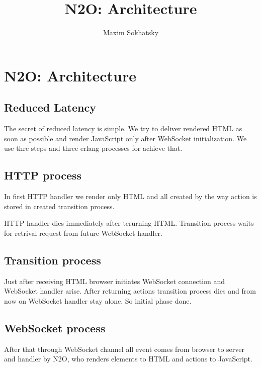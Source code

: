 \documentclass[11pt]{article}
\begin{document}
\title{N2O: Architecture}
\author{Maxim Sokhatsky}

\paragraph{}
\section*{N2O: Architecture}

\subsection*{Reduced Latency}
The secret of reduced latency is simple. We try to deliver rendered HTML
as soon as possible and render JavaScript only after WebSocket initialization.
We use thre steps and three erlang processes for achieve that.


\subsection*{HTTP process}
In first HTTP handler we render only HTML and all created by
the way action is stored in created transition process.


HTTP handler dies immediately after terurning HTML. Transition
process waits for retrival request from future WebSocket handler.

\subsection*{Transition process}
Just after receiving HTML browser initiates WebSocket connection
and WebSocket handler arise. After returning actions transition
process dies and from now on WebSocket handler stay alone.
So initial phase done.

\subsection*{WebSocket process}
After that through WebSocket channel all event comes from
browser to server and handler by N2O, who renders elements
to HTML and actions to JavaScript.







\end{document}
